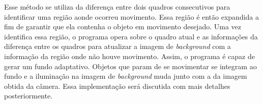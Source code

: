 Esse método se utiliza da diferença entre dois quadros consecutivos para identificar uma região aonde ocorreu movimento. Essa região é então expandida a fim de garantir que ela contenha o objeto em movimento desejado. Uma vez identifica essa região, o programa opera sobre o quadro atual e as informações da diferença entre os quadros para atualizar a imagem de \textit{background} com a informação da região onde não houve movimento. Assim, o programa é capaz de gerar um fundo adaptativo. Objetos que param de se movimentar se integram ao fundo e a iluminação na imagem de \textit{background} muda junto com a da imagem obtida da câmera. Essa implementação será discutida com mais detalhes posteriormente.


